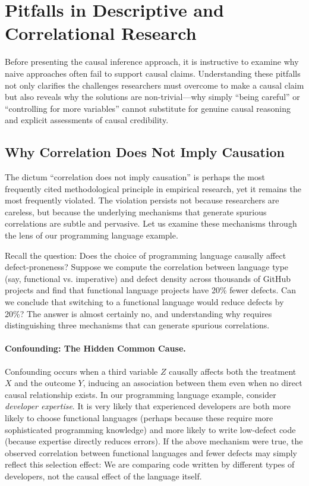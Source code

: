 \section{Pitfalls in Descriptive and Correlational Research}
\label{sec:pitfalls}

Before presenting the causal inference approach, it is instructive to examine why naive approaches often fail to support causal claims.
Understanding these pitfalls not only clarifies the challenges researchers must overcome to make a causal claim but also reveals why the solutions are non-trivial---why simply ``being careful'' or ``controlling for more variables'' cannot substitute for genuine causal reasoning and explicit assessments of causal credibility.

\subsection{Why Correlation Does Not Imply Causation}

The dictum ``correlation does not imply causation'' is perhaps the most frequently cited methodological principle in empirical research, yet it remains the most frequently violated.
The violation persists not because researchers are careless, but because the underlying mechanisms that generate spurious correlations are subtle and pervasive.
Let us examine these mechanisms through the lens of our programming language example.

Recall the question: Does the choice of programming language causally affect defect-proneness?
Suppose we compute the correlation between language type (say, functional vs. imperative) and defect density across thousands of GitHub projects and find that functional language projects have 20\% fewer defects.
Can we conclude that switching to a functional language would reduce defects by 20\%?
The answer is almost certainly no, and understanding why requires distinguishing three mechanisms that can generate spurious correlations.

\paragraph{Confounding: The Hidden Common Cause.}
Confounding occurs when a third variable $Z$ causally affects both the treatment $X$ and the outcome $Y$, inducing an association between them even when no direct causal relationship exists.
In our programming language example, consider \emph{developer expertise}.
It is very likely that experienced developers are both more likely to choose functional languages (perhaps because these require more sophisticated programming knowledge) and more likely to write low-defect code (because expertise directly reduces errors).
If the above mechanism were true, the observed correlation between functional languages and fewer defects may simply reflect this selection effect: We are comparing code written by different types of developers, not the causal effect of the language itself.

